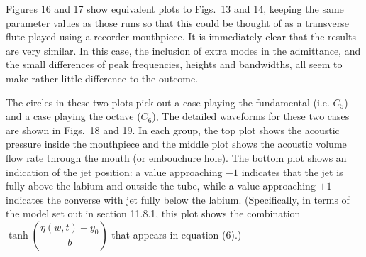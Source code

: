   Figures 16 and 17 show equivalent plots to Figs.\ 13 and 14, keeping the same 
  parameter values as those runs so that this could be thought of as a 
  transverse flute played using a recorder mouthpiece. It is immediately clear 
  that the results are very similar. In this case, the inclusion of extra modes 
  in the admittance, and the small differences of peak frequencies, heights and 
  bandwidths, all seem to make rather little difference to the outcome. 



  The circles in these two plots pick out a case playing the fundamental (i.e. 
  $C_5$) and a case playing the octave ($C_6$), The detailed waveforms for 
  these two cases are shown in Figs.\ 18 and 19. In each group, the top plot 
  shows the acoustic pressure inside the mouthpiece and the middle plot shows 
  the acoustic volume flow rate through the mouth (or embouchure hole). The 
  bottom plot shows an indication of the jet position: a value approaching $-1$ 
  indicates that the jet is fully above the labium and outside the tube, while 
  a value approaching $+1$ indicates the converse with jet fully below the 
  labium. (Specifically, in terms of the model set out in section 11.8.1, this 
  plot shows the combination $\tanh \left( \dfrac{\eta(w,t)-y_0}{b} \right)$ 
  that appears in equation (6).) 



